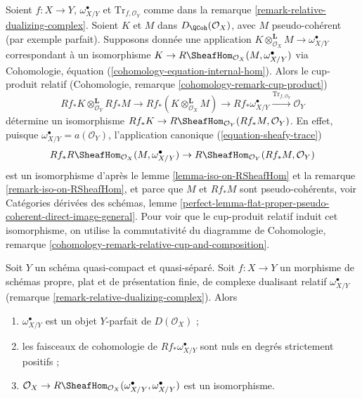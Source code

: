 \begin{remark}
\label{remark-relative-dualizing-complex-relative-cup-product}
Soient $f : X \to Y$, $\omega^\bullet_{X/Y}$ et $\text{Tr}_{f, \mathcal{O}_Y}$ comme dans la remarque \ref{remark-relative-dualizing-complex}. Soient $K$ et $M$ dans $D_\QCoh(\mathcal{O}_X)$, avec $M$ pseudo-cohérent (par exemple parfait). Supposons donnée une application
$K \otimes_{\mathcal{O}_X}^\mathbf{L} M \to \omega^\bullet_{X/Y}$
correspondant à un isomorphisme
$K \to R\SheafHom_{\mathcal{O}_X}(M, \omega^\bullet_{X/Y})$
via Cohomologie, équation (\ref{cohomology-equation-internal-hom}). Alors le cup-produit relatif (Cohomologie, remarque \ref{cohomology-remark-cup-product})
$$
Rf_*K \otimes_{\mathcal{O}_Y}^\mathbf{L} Rf_*M
\to
Rf_*(K \otimes_{\mathcal{O}_X}^\mathbf{L} M)
\to
Rf_*\omega^\bullet_{X/Y}
\xrightarrow{\text{Tr}_{f, \mathcal{O}_Y}}
\mathcal{O}_Y
$$
détermine un isomorphisme $Rf_*K \to R\SheafHom_{\mathcal{O}_Y}(Rf_*M, \mathcal{O}_Y)$. En effet, puisque $\omega^\bullet_{X/Y} = a(\mathcal{O}_Y)$, l'application canonique (\ref{equation-sheafy-trace})
$$
Rf_*R\SheafHom_{\mathcal{O}_X}(M, \omega^\bullet_{X/Y}) \to
R\SheafHom_{\mathcal{O}_Y}(Rf_*M, \mathcal{O}_Y)
$$
est un isomorphisme d'après le lemme \ref{lemma-iso-on-RSheafHom} et la remarque \ref{remark-iso-on-RSheafHom}, et parce que $M$ et $Rf_*M$ sont pseudo-cohérents, voir Catégories dérivées des schémas, lemme \ref{perfect-lemma-flat-proper-pseudo-coherent-direct-image-general}. Pour voir que le cup-produit relatif induit cet isomorphisme, on utilise la commutativité du diagramme de Cohomologie, remarque \ref{cohomology-remark-relative-cup-and-composition}.
\end{remark}

\begin{lemma}
\label{lemma-properties-relative-dualizing}
Soit $Y$ un schéma quasi-compact et quasi-séparé. Soit $f : X \to Y$ un morphisme de schémas propre, plat et de présentation finie, de complexe dualisant relatif $\omega_{X/Y}^\bullet$ (remarque \ref{remark-relative-dualizing-complex}). Alors
\begin{enumerate}
\item $\omega_{X/Y}^\bullet$ est un objet $Y$-parfait de $D(\mathcal{O}_X)$ ;
\item les faisceaux de cohomologie de $Rf_*\omega_{X/Y}^\bullet$ sont nuls en degrés strictement positifs ;
\item $\mathcal{O}_X \to
R\SheafHom_{\mathcal{O}_X}(\omega_{X/Y}^\bullet, \omega_{X/Y}^\bullet)$ est un isomorphisme.
\end{enumerate}
\end{lemma}

